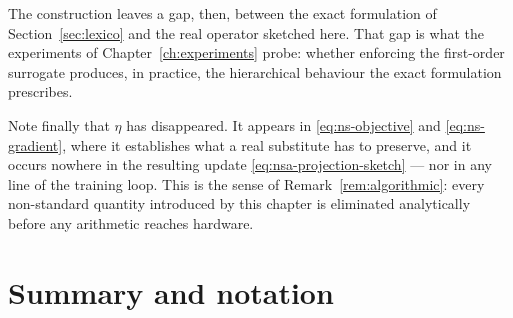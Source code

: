 The construction leaves a gap, then, between the exact formulation of
Section~\ref{sec:lexico} and the real operator sketched here. That gap is what the
experiments of Chapter~\ref{ch:experiments} probe: whether enforcing the first-order
surrogate produces, in practice, the hierarchical behaviour the exact formulation
prescribes.

Note finally that $\eta$ has disappeared. It appears in \eqref{eq:ns-objective} and
\eqref{eq:ns-gradient}, where it establishes what a real substitute has to preserve,
and it occurs nowhere in the resulting update \eqref{eq:nsa-projection-sketch} --- nor
in any line of the training loop. This is the sense of
Remark~\ref{rem:algorithmic}: every non-standard quantity introduced by this chapter
is eliminated analytically before any arithmetic reaches hardware.

\section{Summary and notation}
\label{sec:nsa-summary}

